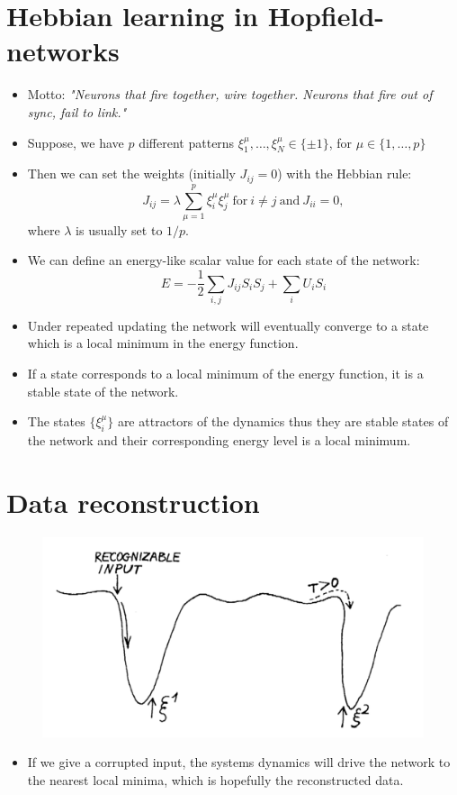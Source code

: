 \documentclass[12pt]{article}
\numberwithin{equation}{section}
\begin{document}
\section*{Hebbian learning in Hopfield-networks}
\begin{itemize}
    \item Motto: \textit{"Neurons that fire together, wire together. Neurons that fire out of sync, fail to link."}
    \item Suppose, we have $p$ different patterns $\xi^{\mu}_1, \dots, \xi^{\mu}_N \in \{\pm 1\}$, for $\mu \in \{1,\dots,p\}$
    \item Then we can set the weights (initially $J_{ij}=0$) with the Hebbian rule:
    \begin{equation*}
        J_{ij} = \lambda\sum\limits_{\mu=1}^{p}\xi^{\mu}_i\xi^{\mu}_j~\textrm{for}~i\neq j~\textrm{and}~J_{ii}=0,
    \end{equation*}
    where $\lambda$ is usually set to $1/p$.
    \item We can define an energy-like scalar value for each state of the network:
    \begin{equation*}
        E = -\frac{1}{2}\sum\limits_{i,j}J_{ij}S_iS_j + \sum\limits_iU_iS_i
    \end{equation*}
    \item Under repeated updating the network will eventually converge to a state which is a
    local minimum in the energy function.
    \item If a state corresponds to a local minimum of the energy function, it is a stable state of the network.
    \item The states $\{\xi_i^{\mu}\}$ are attractors of the dynamics thus they are stable states of the network and
    their corresponding energy level is a local minimum.
\end{itemize}

\newpage
\section*{Data reconstruction}
\begin{figure}[h!]
    \centering
    \includegraphics[height=0.5\textheight]{images/hopfield-energy-plot.png}
\end{figure}
\begin{itemize}
    \item If we give a corrupted input, the systems dynamics will drive the network to the
    nearest local minima, which is hopefully the reconstructed data.
\end{itemize}
\end{document}
